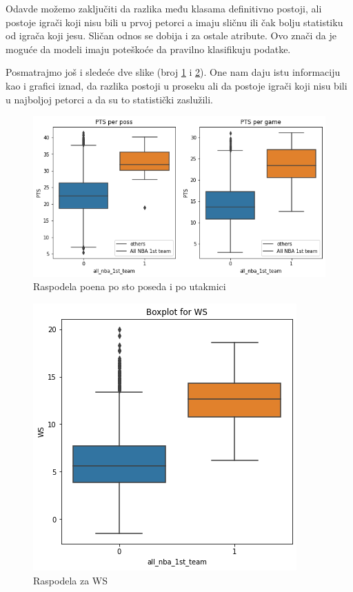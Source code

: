 \documentclass[a4paper]{article}
\begin{document}
Odavde možemo zaključiti da razlika među klasama definitivno postoji, ali
postoje igrači koji nisu bili u prvoj petorci a imaju sličnu ili čak bolju statistiku od igrača koji jesu. Sličan odnos se dobija i za ostale atribute. Ovo znači da je moguće da modeli imaju poteškoće da pravilno klasifikuju podatke. 

Posmatrajmo još i sledeće dve slike (broj \ref{plt:box_plot_pts} i \ref{plt:box_plot_ws}). One nam daju istu informaciju kao i grafici iznad, da razlika postoji u proseku ali da postoje igrači koji nisu bili u najboljoj petorci a da su to statistički zaslužili.

\begin{figure}[h!]
\begin{center}
\includegraphics[scale=0.40]{box_plot_pts.png}
\end{center}
\caption{Raspodela poena po sto poseda i po utakmici}
\label{plt:box_plot_pts}
\end{figure}

\begin{figure}[h!]
\begin{center}
\includegraphics[scale=0.40]{box_plot_ws.png}
\end{center}
\caption{Raspodela za WS}
\label{plt:box_plot_ws}
\end{figure}
\end{document}
